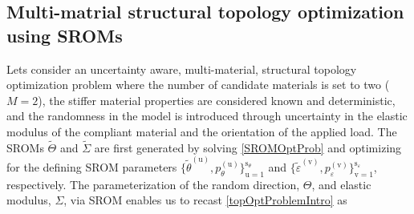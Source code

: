 \subsection{Multi-matrial structural topology optimization using SROMs}

Lets consider an uncertainty aware, multi-material, structural topology optimization problem where the number of candidate materials is set to two ($M=2$), the stiffer material properties are considered known and deterministic, and the randomness in the model is introduced through uncertainty in the elastic modulus of the compliant material and the orientation of the applied load. The SROMs $\tilde{\Theta}$ and $\tilde{\Sigma}$ are first generated by solving \eqref{SROMOptProb} and optimizing for the defining SROM parameters $\{ \tilde{\theta}^{(\mathrm{u})}, p_{\theta}^{(\mathrm{u})} \}_{\mathrm{u}=1}^{\mathrm{s}_{\theta}}$ and $\{ \tilde{\varepsilon}^{(\mathrm{v})}, p_{\varepsilon}^{(\mathrm{v})} \}_{\mathrm{v}=1}^{\mathrm{s}_{\varepsilon}}$, respectively. The parameterization of the random direction, $\Theta$, and elastic modulus, $\Sigma$, via SROM enables us to recast \eqref{topOptProblemIntro} as

